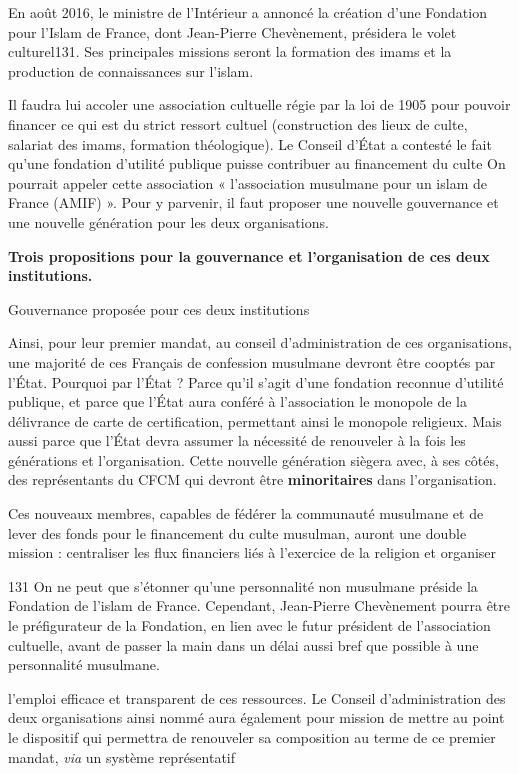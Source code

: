 En août 2016, le ministre de l'Intérieur a annoncé la création d'une
Fondation pour l'Islam de France, dont Jean-Pierre Chevènement,
présidera le volet culturel131. Ses principales missions seront la
formation des imams et la production de connaissances sur l'islam.

Il faudra lui accoler une association cultuelle régie par la loi de 1905
pour pouvoir financer ce qui est du strict ressort cultuel (construction
des lieux de culte, salariat des imams, formation théologique). Le
Conseil d'État a contesté le fait qu'une fondation d'utilité publique
puisse contribuer au financement du culte On pourrait appeler cette
association « l'association musulmane pour un islam de France (AMIF) ».
Pour y parvenir, il faut proposer une nouvelle gouvernance et une
nouvelle génération pour les deux organisations.

\textbf{Trois propositions pour la gouvernance et l'organisation de ces
deux institutions.}


Gouvernance proposée pour ces deux institutions


Ainsi, pour leur premier mandat, au conseil d'administration de ces
organisations, une majorité de ces Français de confession musulmane
devront être cooptés par l'État. Pourquoi par l'État ? Parce qu'il
s'agit d'une fondation reconnue d'utilité publique, et parce que l'État
aura conféré à l'association le monopole de la délivrance de carte de
certification, permettant ainsi le monopole religieux. Mais aussi parce
que l'État devra assumer la nécessité de renouveler à la fois les
générations et l'organisation. Cette nouvelle génération siègera avec, à
ses côtés, des représentants du CFCM qui devront être
\textbf{minoritaires} dans l'organisation.

Ces nouveaux membres, capables de fédérer la communauté musulmane et de
lever des fonds pour le financement du culte musulman, auront une double
mission : centraliser les flux financiers liés à l'exercice de la
religion et organiser

131 On ne peut que s'étonner qu'une personnalité non musulmane préside
la Fondation de l'islam de France. Cependant, Jean-Pierre Chevènement
pourra être le préfigurateur de la Fondation, en lien avec le futur
président de l'association cultuelle, avant de passer la main dans un
délai aussi bref que possible à une personnalité musulmane.



l'emploi efficace et transparent de ces ressources. Le Conseil
d'administration des deux organisations ainsi nommé aura également pour
mission de mettre au point le dispositif qui permettra de renouveler sa
composition au terme de ce premier mandat, \emph{via} un système
représentatif


